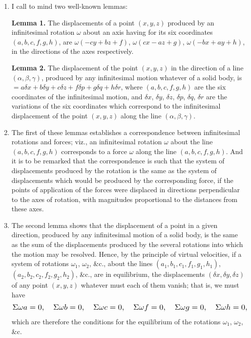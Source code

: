 \documentclass[12pt,a4paper]{article}
\theoremstyle{plain}
\theoremstyle{definition}
\theoremstyle{remark}
\begin{document}
\begin{enumerate}[label=\arabic*.]
\item I call to mind two well-known lemmas:

\textbf{Lemma 1.} The displacements of a point $(x,y,z)$ produced by an infinitesimal rotation $\omega$ about an axis having for its six coordinates $(a,b,c,f,g,h)$, are $\omega(-cy+bz+f)$, $\omega(cx-az+g)$, $\omega(-bx+ay+h)$, in the directions of the axes respectively.

\textbf{Lemma 2.} The displacement of the point $(x,y,z)$ in the direction of a line $(\alpha, \beta, \gamma)$, produced by any infinitesimal motion whatever of a solid body, is $= a\delta x + b\delta y + c\delta z + f\delta p + g\delta q + h\delta r$, where $(a,b,c,f,g,h)$ are the six coordinates of the infinitesimal motion, and $\delta x$, $\delta y$, $\delta z$, $\delta p$, $\delta q$, $\delta r$ are the variations of the six coordinates which correspond to the infinitesimal displacement of the point $(x,y,z)$ along the line $(\alpha, \beta, \gamma)$.

\item The first of these lemmas establishes a correspondence between infinitesimal rotations and forces; viz., an infinitesimal rotation $\omega$ about the line $(a,b,c,f,g,h)$ corresponds to a force $\omega$ along the line $(a,b,c,f,g,h)$. And it is to be remarked that the correspondence is such that the system of displacements produced by the rotation is the same as the system of displacements which would be produced by the corresponding force, if the points of application of the forces were displaced in directions perpendicular to the axes of rotation, with magnitudes proportional to the distances from these axes.

\item The second lemma shows that the displacement of a point in a given direction, produced by any infinitesimal motion of a solid body, is the same as the sum of the displacements produced by the several rotations into which the motion may be resolved. Hence, by the principle of virtual velocities, if a system of rotations $\omega_1$, $\omega_2$, \&c., about the lines $(a_1,b_1,c_1,f_1,g_1,h_1)$, $(a_2,b_2,c_2,f_2,g_2,h_2)$, \&c., are in equilibrium, the displacements $(\delta x, \delta y, \delta z)$ of any point $(x,y,z)$ whatever must each of them vanish; that is, we must have
\[
\resizebox{\textwidth}{!}{$\displaystyle \Sigma \omega a = 0, \quad \Sigma \omega b = 0, \quad \Sigma \omega c = 0, \quad \Sigma \omega f = 0, \quad \Sigma \omega g = 0, \quad \Sigma \omega h = 0, $}
\]
which are therefore the conditions for the equilibrium of the rotations $\omega_1$, $\omega_2$, \&c.


\end{enumerate}
\end{document}
